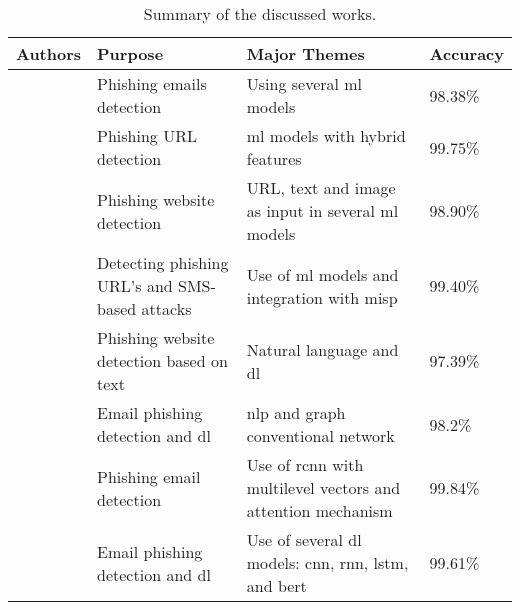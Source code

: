 \begin{table}[ht]
    \centering
    \begin{tabular}{p{4cm}p{4cm}p{4cm}p{2cm}}
    \hline
    \textbf{Authors} & \textbf{Purpose} & \textbf{Major Themes} & \textbf{Accuracy} \\
    \hline
    \citet{rabbi2023phishy} & Phishing emails detection & Using several \ac{ml} models & 98.38\% \\
    \hline
    \citet{Kumar2023222} & Phishing URL detection & \ac{ml} models with hybrid features & 99.75\% \\
    \hline
    \citet{Shaukat2023} & Phishing website detection & URL, text and image as input in several \ac{ml} models & 98.90\% \\
    \hline
    \citet{Karhani2023206} & Detecting phishing URL's and SMS-based attacks & Use of \ac{ml} models and integration with \ac{misp} & 99.40\% \\
    \hline
    \citet{Benavides-Astudillo2023} & Phishing website detection based on text & Natural language and \ac{dl} & 97.39\% \\
    \hline
    \citet{ALHOGAIL2021102414} & Email phishing detection and \ac{dl} & \ac{nlp} and graph conventional network & 98.2\% \\
    \hline
    \citet{8701426} & Phishing email detection & Use of \ac{rcnn} with multilevel vectors and attention mechanism & 99.84\% \\
    \hline
    \citet{atawneh2023phishing} & Email phishing detection and \ac{dl} & Use of several \ac{dl} models: \ac{cnn}, \ac{rnn}, \ac{lstm}, and \ac{bert} & 99.61\% \\
    \hline
    \end{tabular}
    \caption{Summary of the discussed works.}
    \label{tbl:c2:comparison_table}
    \end{table}